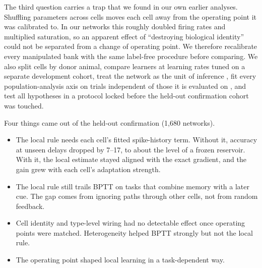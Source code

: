The third question carries a trap that we found in our own earlier analyses. Shuffling parameters
across cells moves each cell away from the operating point it was calibrated to. In our networks
this roughly doubled firing rates and multiplied saturation, so an apparent effect of
``destroying biological identity'' could not be separated from a change of operating point. We therefore
recalibrate every manipulated bank with the same label-free procedure before comparing. We also
split cells by donor animal, compare learners at learning rates tuned on a separate development
cohort, treat the network as the unit of inference \citep{aarts2014}, fit every population-analysis
axis on trials independent of those it is evaluated on \citep{kriegeskorte2009}, and test all
hypotheses in a protocol locked before the held-out confirmation cohort was touched.

Four things came out of the held-out confirmation (1,680 networks).
\begin{itemize}
\item The local rule needs each cell's fitted spike-history term. Without it, accuracy at unseen
delays dropped by 7--17\pp, to about the level of a frozen reservoir. With it, the local
estimate stayed aligned with the exact gradient, and the gain grew with each cell's adaptation
strength.
\item The local rule still trails BPTT on tasks that combine memory with a later cue. The gap
comes from ignoring paths through other cells, not from random feedback.
\item Cell identity and type-level wiring had no detectable effect once operating points were
matched. Heterogeneity helped BPTT strongly but not the local rule.
\item The operating point shaped local learning in a task-dependent way.
\end{itemize}
